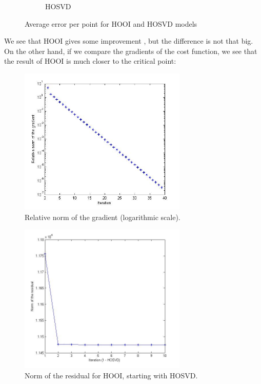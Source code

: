 \begin{figure}
\begin{subfigure}[b]{0.55\textwidth}
                \caption{HOSVD}
                \label{HOSVD_face}
        \end{subfigure}
        \caption{Average error per point for HOOI and HOSVD models}
        \label{fig:hooi_hosvd_comparison}
\end{figure}

We see that HOOI gives some improvement 
, but the difference is not that big. On the other hand, if we compare the 
gradients of the cost function, we see that the result of HOOI is much closer to the 
critical point:

\begin{figure}
        \centering
                \includegraphics[width=8cm]{images/hooi_gradient_plot.jpg}
        \caption{Relative norm of the gradient (logarithmic scale).}
        \label{fig:hooi_grad_plot}
\end{figure}



\begin{figure}
        \centering
                \includegraphics[width=8cm]{images/hooi_hosvd_residual_plot.jpg}
        \caption{Norm of the residual for HOOI, starting with HOSVD.}
        \label{fig:hooi_hosvd_resid_plot}
\end{figure}




